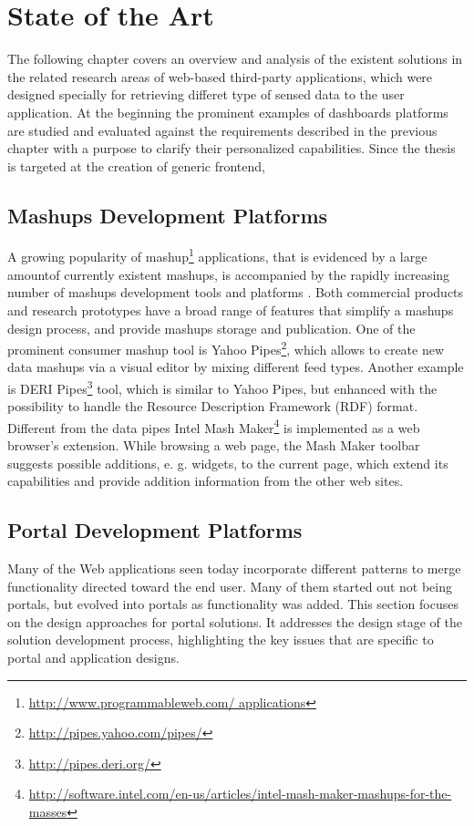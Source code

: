 \chapter{State of the Art}
The following chapter covers an overview and analysis of the existent solutions in
the related research areas of web-based third-party applications, which were designed specially for retrieving differet type of sensed data to the user application. At the beginning the prominent examples of dashboards platforms are studied and evaluated against the requirements described in the previous chapter with a purpose to clarify their personalized capabilities.
 Since the thesis is targeted at the creation of generic frontend, 

\section{Mashups Development Platforms}
A growing popularity of mashup\footnote{\url{http://www.programmableweb.com/ applications}} applications, that is evidenced by a large amountof currently existent mashups, is accompanied by the rapidly increasing number of
mashups development tools and platforms \cite{taivalsaari2009mashware, koschmider2009elucidating, daniel2010toward, aghaee2012reusable}. Both commercial products and research prototypes have a broad range of features that
simplify a mashups design process, and provide mashups storage and publication.
One of the prominent consumer mashup tool is Yahoo Pipes\footnote{\url{http://pipes.yahoo.com/pipes/}}, which allows to create new data mashups via a visual editor by mixing different feed types. Another example is DERI Pipes\footnote{\url{http://pipes.deri.org/}} tool, which is similar to Yahoo Pipes, but enhanced with the possibility to handle the Resource Description
Framework (RDF) format. Different from the data pipes Intel Mash Maker\footnote{\url{http://software.intel.com/en-us/articles/intel-mash-maker-mashups-for-the-masses}} is implemented as a web browser’s extension. While browsing a web page, the Mash
Maker toolbar suggests possible additions, e. g. widgets, to the current page, which
extend its capabilities and provide addition information from the other web sites.

\section{Portal Development Platforms}
Many of the Web applications seen today incorporate different patterns to merge
functionality directed toward the end user. Many of them started out not being
portals, but evolved into portals as functionality was added.
This section focuses on the design approaches for portal solutions. 
It addresses the design stage of the solution development process, highlighting the key issues that are specific to portal and
application designs\cite{pautasso2008restful,seong2006usability}.


